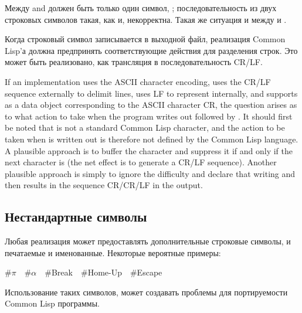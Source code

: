Между  and  должен быть только один символ,
; последовательность из двух строковых символов
такая, как  и,
некорректна.
Такая же ситуация и между  и .

Когда строковый символ  записывается в выходной файл,
реализация Common Lisp'а должна предпринять соответствующие действия для
разделения строк. Это может быть реализовано, как трансляция
 в последовательность CR/LF.

\beforenoterule
\begin{implementation}
If an implementation uses the ASCII character encoding,
uses the CR/LF sequence externally to delimit lines,
uses LF to represent  internally, and supports 
as a data object corresponding to the ASCII character CR, the
question arises as to what action to take when the program
writes out  followed by .
It should first be noted that  is not a standard Common Lisp
character, and the action to be taken when  is written out
is therefore not defined by the Common Lisp language.  A plausible approach
is to buffer the  character and suppress it if and only if the
next character is  (the net effect is to generate a CR/LF
sequence).
Another plausible
approach is simply to ignore
the difficulty and declare that writing  and then
 results in the sequence CR/CR/LF in the output.
\end{implementation}
\afternoterule

\subsection{Нестандартные символы}

Любая реализация может предоставлять дополнительные строковые символы, и
печатаемые и именованные. Некоторые вероятные примеры:

\begin{lisp}
\#{\Xbackslash}$\pi$~~\#{\Xbackslash}$\alpha$~~\#{\Xbackslash}Break~~\#{\Xbackslash}Home-Up~~\#{\Xbackslash}Escape
\end{lisp}

Использование таких символов, может создавать проблемы для портируемости Common
Lisp программы.

